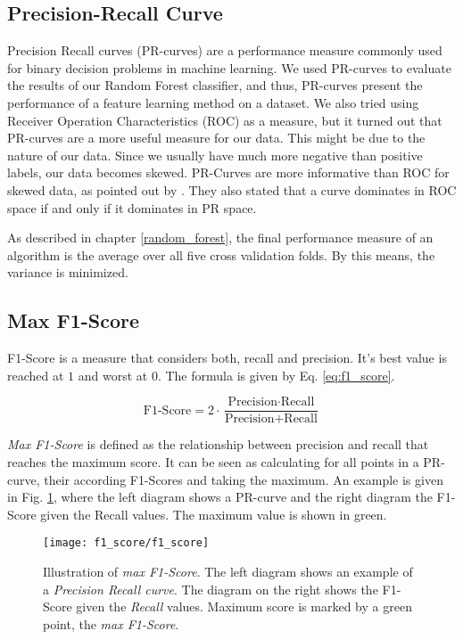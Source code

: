 \subsection{Precision-Recall Curve}
Precision Recall curves (PR-curves) are a performance measure commonly used for binary decision problems in machine learning.
We used PR-curves to evaluate the results of our Random Forest classifier, and thus, PR-curves present the performance of a feature learning method on a dataset.
We also tried using Receiver Operation Characteristics (ROC) as a measure, but it turned out that PR-curves are a more useful measure for our data.
This might be due to the nature of our data.
Since we usually have much more negative than positive labels, our data becomes skewed.
PR-Curves are more informative than ROC for skewed data, as pointed out by \cite{davis06}. They also stated that a curve dominates in ROC space if and only if it dominates in PR space.

As described in chapter \ref{random_forest}, the final performance measure of an algorithm is the average over all five cross validation folds. By this means, the variance is minimized.

\clearpage
\subsection{Max F1-Score} \label{ch:scores}
F1-Score is a measure that considers both, recall and precision. It's best value is reached at $1$ and worst at $0$. The formula is given by Eq. \ref{eq:f1_score}.

\begin{equation}
\textrm{F1-Score} = 2 \cdot \frac{\textrm{Precision} \cdot \textrm{Recall}}{\textrm{Precision} + \textrm{Recall}}
\label{eq:f1_score}
\end{equation}
\hspace{6pt}

\textit{Max F1-Score} is defined as the relationship between precision and recall that reaches the maximum score. It can be seen as calculating for all points in a PR-curve, their according F1-Scores and taking the maximum. An example is given in Fig. \ref{fig:f1_score}, where the left diagram shows a PR-curve and the right diagram the F1-Score given the Recall values. The maximum value is shown in green.

\begin{figure}[ht]
  \centering
  \texttt{[image: f1\_score/f1\_score]}
  \caption[Illustration of max F1-Score]{Illustration of \textit{max F1-Score}. The left diagram shows an example of a \textit{Precision Recall curve}. The diagram on the right shows the F1-Score given the \textit{Recall} values. Maximum score is marked by a green point, the \textit{max F1-Score}.}
  \label{fig:f1_score}
\end{figure}


